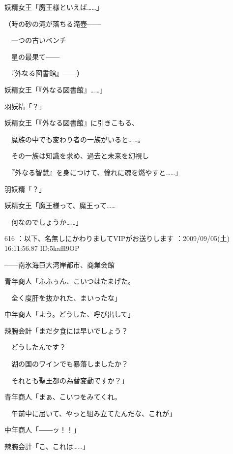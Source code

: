 \documentclass[a4j,twocolumn]{tarticle}
\begin{document}
妖精女王「魔王様といえば……」 



（時の砂の滝が落ちる滝壺―― \par{}
　一つの古いベンチ\par{} 
　星の最果て―― \par{}
　『外なる図書館』――） 

妖精女王「『外なる図書館』……」 



羽妖精「？」 



妖精女王「『外なる図書館』に引きこもる、\par{} 
　魔族の中でも変わり者の一族がいると……。\par{} 
　その一族は知識を求め、過去と未来を幻視し\par{} 
　『外なる智慧』を身につけて、憧れに魂を燃やすと……」 



羽妖精「？」 



妖精女王「魔王様って、魔王って……\par{} 
　何なのでしょうか……」 

	
    
    

616 ：以下、名無しにかわりましてVIPがお送りします ：2009/09/05(土) 16:11:56.87 ID:5kaffl9OP 


――南氷海巨大湾岸都市、商業会館 



青年商人「ふふぅん、こいつはたまげた。\par{} 
　全く度肝を抜かれた、まいったな」 



中年商人「よう。どうした、呼び出して」 



辣腕会計「まだ夕食には早いでしょう？\par{} 
　どうしたんです？ \par{}
　湖の国のワインでも暴落しましたか？ \par{}
　それとも聖王都の為替変動ですか？」 



青年商人「まぁ、こいつをみてくれ。\par{} 
　午前中に届いて、やっと組み立てたんだな、これが」 



中年商人「――ッ！！」 \par{}
辣腕会計「こ、これは……」 
\end{document}
